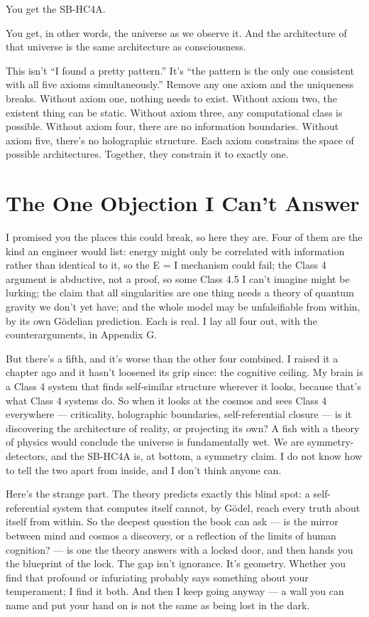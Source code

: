 \documentclass[11pt, twoside, openright]{book}
\begin{document}
You get the SB-HC4A.

You get, in other words, the universe as we observe it. And the architecture of that universe is the same architecture as consciousness.

This isn't ``I found a pretty pattern.'' It's ``the pattern is the only one consistent with all five axioms simultaneously.'' Remove any one axiom and the uniqueness breaks. Without axiom one, nothing needs to exist. Without axiom two, the existent thing can be static. Without axiom three, any computational class is possible. Without axiom four, there are no information boundaries. Without axiom five, there's no holographic structure. Each axiom constrains the space of possible architectures. Together, they constrain it to exactly one.

\section*{The One Objection I Can't Answer}

I promised you the places this could break, so here they are. Four of them are the kind an engineer would list: energy might only be correlated with information rather than identical to it, so the E = I mechanism could fail; the Class 4 argument is abductive, not a proof, so some Class 4.5 I can't imagine might be lurking; the claim that all singularities are one thing needs a theory of quantum gravity we don't yet have; and the whole model may be unfalsifiable from within, by its own Gödelian prediction. Each is real. I lay all four out, with the counterarguments, in Appendix G.

But there's a fifth, and it's worse than the other four combined. I raised it a chapter ago and it hasn't loosened its grip since: the cognitive ceiling. My brain is a Class 4 system that finds self-similar structure wherever it looks, because that's what Class 4 systems do. So when it looks at the cosmos and sees Class 4 everywhere --- criticality, holographic boundaries, self-referential closure --- is it discovering the architecture of reality, or projecting its own? A fish with a theory of physics would conclude the universe is fundamentally wet. We are symmetry-detectors, and the SB-HC4A is, at bottom, a symmetry claim. I do not know how to tell the two apart from inside, and I don't think anyone can.

Here's the strange part. The theory predicts exactly this blind spot: a self-referential system that computes itself cannot, by Gödel, reach every truth about itself from within. So the deepest question the book can ask --- is the mirror between mind and cosmos a discovery, or a reflection of the limits of human cognition? --- is one the theory answers with a locked door, and then hands you the blueprint of the lock. The gap isn't ignorance. It's geometry. Whether you find that profound or infuriating probably says something about your temperament; I find it both. And then I keep going anyway --- a wall you can name and put your hand on is not the same as being lost in the dark.
\end{document}
